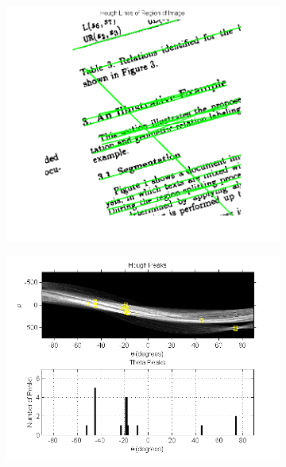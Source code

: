 \documentclass{report}
\begin{document}
\begin{figure}%
\setcounter{subfigure}{0}
\centering
\begin{subfigure}{.45\columnwidth}
\includegraphics [width=\columnwidth]{HoughLinesEx.png}
\end{subfigure}
\hfill%
\begin{subfigure}{.5\columnwidth}
\includegraphics [width=\columnwidth]{HoughPeaksEx.png}
\end{subfigure}
\end{figure}
\end{document}
